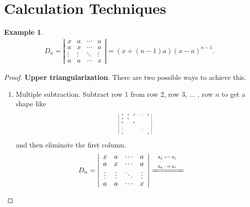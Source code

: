 \documentclass{report}
\newtheorem{example}{Example}[section]
\theoremstyle{nonumberplain}
\newtheorem{proof}{Proof.}
\newcommand{\minuseq}{\mathrel{{-}{=}}}
\newcommand\scalemath[2]{\scalebox{#1}{\mbox{\ensuremath{\displaystyle #2}}}}
\begin{document}
\section{Calculation Techniques}
\begin{example}\label{example:Upper triangularization}
	\begin{align*}
		D_{n}=\left|\begin{array}{cccc}
			x & a & \cdots & a \\
			a & x & \cdots & a \\
			\vdots & \vdots & \ddots & \vdots \\
			a & a & \cdots & x
		\end{array}\right|=\left(x+(n-1)a\right)\left(x-a\right)^{n-1}.
	\end{align*}
\end{example}
\begin{proof}
	\textbf{Upper triangularization}. There are two possible ways to achieve this.
	\begin{enumerate}
		\item Multiple subtraction. Subtract row 1 from row 2, row 3, ... , row $n$ to get a shape like 
		\begin{equation*}
			\scalemath{0.55}{
			\left|\begin{array}{ccccc}
			* & * & * &\cdots & * \\
			* & * &  &  &  \\
			* &   & *&  &  \\
			\vdots &  &   &\ddots &  \\
			* &  &  &  & *
			\end{array}\right|}
		\end{equation*}
	and then eliminate the first column.
		\begin{equation*}		
			\begin{aligned}
				D_{n}=\left|\begin{array}{cccc}
					x & a & \cdots & a \\
					a & x & \cdots & a \\
					\vdots & \vdots & \ddots & \vdots \\
					a & a & \cdots & x
				\end{array}\right|&\xlongequal{\scalemath{0.65}{\arraycolsep=10pt\def\arraystretch{0.85}
				\begin{array}{l}
					\mathtt{r_2\minuseq r_1}\\
					\cdots\\ 
					\mathtt{r_n\minuseq r_1}
				\end{array}}}

\end{aligned}
\end{equation*}
\end{enumerate}
\end{proof}
\end{document}
